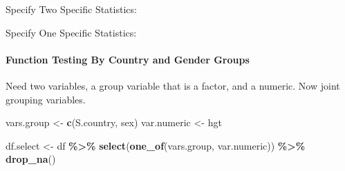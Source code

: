 \documentclass[
]{book}
\newenvironment{Shaded}{\begin{snugshade}}{\end{snugshade}}
\newcommand{\DataTypeTok}[1]{\textcolor[rgb]{0.13,0.29,0.53}{#1}}
\newcommand{\KeywordTok}[1]{\textcolor[rgb]{0.13,0.29,0.53}{\textbf{#1}}}
\newcommand{\NormalTok}[1]{#1}
\newcommand{\OperatorTok}[1]{\textcolor[rgb]{0.81,0.36,0.00}{\textbf{#1}}}
\newcommand{\StringTok}[1]{\textcolor[rgb]{0.31,0.60,0.02}{#1}}
\begin{document}
Specify Two Specific Statistics:

\begin{Shaded}
\end{Shaded}

Specify One Specific Statistics:

\begin{Shaded}
\end{Shaded}

\hypertarget{function-testing-by-country-and-gender-groups}{%
\paragraph{Function Testing By Country and Gender Groups}\label{function-testing-by-country-and-gender-groups}}

Need two variables, a group variable that is a factor, and a numeric. Now joint grouping variables.

\begin{Shaded}
\begin{Highlighting}[]
\NormalTok{vars.group \textless{}{-}}\StringTok{ }\KeywordTok{c}\NormalTok{(}\StringTok{\textquotesingle{}S.country\textquotesingle{}}\NormalTok{, }\StringTok{\textquotesingle{}sex\textquotesingle{}}\NormalTok{)}
\NormalTok{var.numeric \textless{}{-}}\StringTok{ \textquotesingle{}hgt\textquotesingle{}}
\end{Highlighting}
\end{Shaded}

\begin{Shaded}
\begin{Highlighting}[]
\NormalTok{df.select \textless{}{-}}\StringTok{ }\NormalTok{df }\OperatorTok{\%\textgreater{}\%}\StringTok{ }\KeywordTok{select}\NormalTok{(}\KeywordTok{one\_of}\NormalTok{(vars.group, var.numeric)) }\OperatorTok{\%\textgreater{}\%}\StringTok{ }\KeywordTok{drop\_na}\NormalTok{()}
\end{Highlighting}
\end{Shaded}
\end{document}
